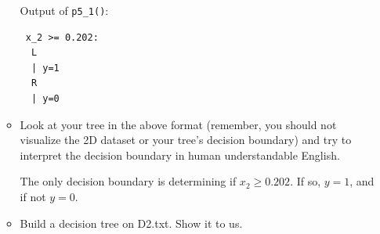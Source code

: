 \documentclass[a4paper]{article}
\theoremstyle{definition}
\newenvironment{soln}{
    \leavevmode\color{blue}\ignorespaces
}{}
\begin{document}
\begin{enumerate}
\begin{itemize}
          \begin{soln}
            Output of \verb|p5_1()|:
\begin{verbatim}
 x_2 >= 0.202:
  L
  | y=1
  R
  | y=0
\end{verbatim}
          \end{soln}

    \item Look at your tree in the above format (remember, you should not visualize the 2D dataset or your tree's decision boundary) and try to interpret the decision boundary in human understandable English.

          \begin{soln}
            The only decision boundary is determining if $x_{2}\ge 0.202$. If so, $y=1$, and if not $y=0$.
          \end{soln}

    \item Build a decision tree on D2.txt.  Show it to us.


\end{itemize}
\end{enumerate}
\end{document}
